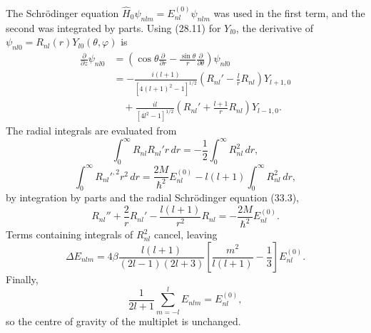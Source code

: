 The Schrödinger equation
$\hat H_0\psi_{nlm}=E_{nl}^{(0)}\psi_{nlm}$ was used in the first term, and
the second was integrated by parts.
Using (28.11) for $Y_{l0}$, the derivative of
$\psi_{nl0}=R_{nl}(r)Y_{l0}(\theta,\varphi)$ is
\[
 \begin{aligned}
  \frac\partial{\partial z}\psi_{nl0}
  &=\left(\cos\theta\frac\partial{\partial r}
    -\frac{\sin\theta}{r}\frac\partial{\partial\theta}\right)\psi_{nl0}\\
  &=-\frac{i(l+1)}{[4(l+1)^2-1]^{1/2}}
    \left(R_{nl}'-\frac lrR_{nl}\right)Y_{l+1,0}\\
  &\quad+\frac{il}{[4l^2-1]^{1/2}}
    \left(R_{nl}'+\frac{l+1}{r}R_{nl}\right)Y_{l-1,0}.
 \end{aligned}
\]
The radial integrals are evaluated from
\[
  \int_0^\infty R_{nl}R_{nl}'r\,dr
  =-\frac12\int_0^\infty R_{nl}^2\,dr,
\]
\[
  \int_0^\infty R_{nl}'^{,2}r^2\,dr
  =\frac{2M}{\hbar^2}E_{nl}^{(0)}
   -l(l+1)\int_0^\infty R_{nl}^2\,dr,
\]
by integration by parts and the radial Schrödinger equation (33.3),
\[
  R_{nl}''+\frac2rR_{nl}'-\frac{l(l+1)}{r^2}R_{nl}
  =-\frac{2M}{\hbar^2}E_{nl}^{(0)}.
\]
Terms containing integrals of $R_{nl}^2$ cancel, leaving
\[
  \Delta E_{nlm}=4\beta\frac{l(l+1)}{(2l-1)(2l+3)}
  \left[\frac{m^2}{l(l+1)}-\frac13\right]E_{nl}^{(0)}.
\]
Finally,
\[
  \frac1{2l+1}\sum_{m=-l}^lE_{nlm}=E_{nl}^{(0)},
\]
so the centre of gravity of the multiplet is unchanged.
